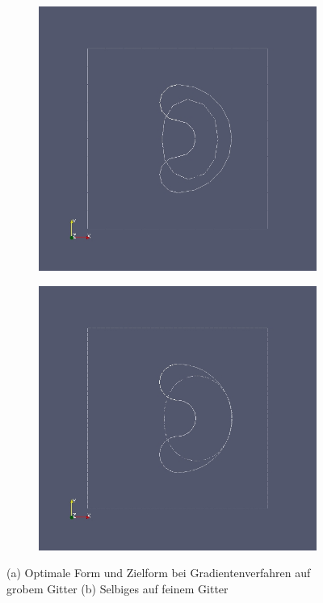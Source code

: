\begin{figure}
	\begin{subfigure}{0.5\textwidth}
	\centering
	\includegraphics[scale=0.25]{pic_brokendonut_gradient.jpg}
	\caption{}	
	\end{subfigure}
	\begin{subfigure}{0.5\textwidth}
	\centering
	\includegraphics[scale=0.25]{pic_brokendonut_gradient_fine.jpg}
	\caption{}	
	\end{subfigure}
\caption{(a) Optimale Form und Zielform bei Gradientenverfahren auf grobem Gitter (b) Selbiges auf feinem Gitter}
\label{brokendonutgradient}
\end{figure}

